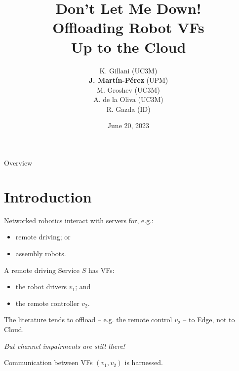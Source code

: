 \documentclass[aspectratio=169,dvipsnames]{beamer}
\title{Don't Let Me Down!\\Offloading Robot VFs \\Up to the Cloud\vspace{1em}}
\date{June 20, 2023}
\author{K. Gillani (UC3M)\\
\textbf{J. Martín-Pérez} (UPM)\\
M. Groshev (UC3M)\\
A. de la Oliva (UC3M)\\
R. Gazda (ID)}
\begin{document}
\begin{frame}
\titlepage
\end{frame}

\begin{frame}{Overview}
    \tableofcontents
\end{frame}

\setcounter{framenumber}{0}


\section{Introduction}
\begin{frame}{\secname}
    Networked robotics interact with servers for, e.g.:
    \begin{itemize}
        \item remote driving; or
        \item assembly robots.
    \end{itemize}

    \vfill

    A remote driving Service $S$ has VFs:
    \begin{itemize}
        \item the robot drivers $v_1$; and
        \item the remote controller $v_2$.
    \end{itemize}
\end{frame}



\begin{frame}{\secname}
    The literature tends to offload -- e.g.
    the remote control $v_2$ -- to Edge, not to Cloud.

    \pause
    \vfill

    \emph{But channel impairments are still there!}

    Communication between VFs $(v_1,v_2)$ is harnessed.
\end{frame}
\end{document}
